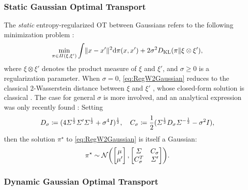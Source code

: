 \subsubsection{Static Gaussian Optimal Transport}
\label{sec:staticGOT}

The \emph{static} entropy-regularized \acrshort{OT} between Gaussians refers to the following minimization problem \citep{peyre2019computational}:
\begin{equation}
\label{eq:RegW2Gaussian}
\min_{\pi \in \Pi(\xi, \xi')} \int  \lVert x-x'\rVert^2  \mathrm{d} \pi(x, x') + 2\sigma^2 D_{\mathrm{KL}}(\pi \| \xi \otimes \xi'),
\end{equation}where $\xi\otimes\xi'$ denotes the product measure of $\xi$ and $\xi'$, and $\sigma \geq 0$ is a regularization parameter. When $\sigma = 0$, \eqref{eq:RegW2Gaussian} reduces to the classical 2-Wasserstein distance between $\xi$ and $\xi'$ \citep{villani2009optimal}, whose closed-form solution is classical \citep{dowson1982frechet, olkin1982distance}. The case for general $\sigma$ is more involved, and an analytical expression was only recently found \citep{bojilov2016matching, del2020statistical, janati2020entropic, mallasto2021entropy}: Setting%
\begin{equation}
\label{eq:Cstar}
D_\sigma \coloneqq ( 4\Sigma^{\frac{1}{2}} \Sigma' \Sigma^{\frac{1}{2}} + \sigma^4I  )^{\frac{1}{2}},\quad C_\sigma \coloneqq \frac{1}{2}(\Sigma^{\frac{1}{2}} D_\sigma \Sigma^{-\frac{1}{2}} - \sigma^2I),
\end{equation}
then the solution $\pi^\star$ to \eqref{eq:RegW2Gaussian} is itself a Gaussian:
\begin{align}
\label{eq:StaticGaussianSB-sol}
\pi^\star \sim \Ncal \parens*{  \begin{bmatrix}
\mu \\
\mu'
\end{bmatrix},  \begin{bmatrix}
\Sigma&C_\sigma\\
C_\sigma^T &\Sigma'
\end{bmatrix}}.
\end{align}

\subsubsection{Dynamic Gaussian Optimal Transport}
\label{sec:dynamicGOT-BB}

